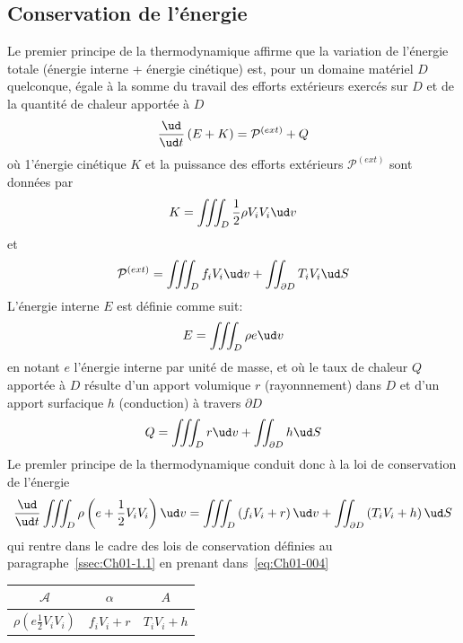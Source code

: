 \subsection{Conservation de l'énergie} \label{ssec:Ch01-3.1}
Le premier principe de la thermodynamique affirme que la variation de l'énergie totale (énergie interne + énergie cinétique) est, pour un domaine matériel $D$ quelconque, égale à la somme du travail des efforts extérieurs exercés sur $D$ et de la quantité de chaleur apportée à $D$
\begin{equation}
    \frac{\ud}{\ud t} \left( E + K \right) = \mathcal{P}^{(ext)} + Q
    \label{eq:Ch01-040}
\end{equation}
où 1'énergie cinétique $K$ et la puissance des efforts extérieurs $\mathcal{P}^{(ext)}$ sont données par
\begin{equation}
    K = \iiint_{D} \frac{1}{2} \rho V_i V_i \ud v
    \label{eq:Ch01-041}
\end{equation}
et
\begin{equation}
    \mathcal{P}^{(ext)} = \iiint_{D} f_i V_i \ud v + \iint_{\partial D} T_i V_i \ud S
    \label{eq:Ch01-042}
\end{equation}
L'énergie interne $E$ est définie comme suit:
\begin{equation}
    E = \iiint_{D} \rho e \ud v
    \label{eq:Ch01-043}
\end{equation}
en notant $e$ l'énergie interne par unité de masse, et où le taux de chaleur $Q$ apportée à $D$ résulte d'un apport volumique $r$ (rayonnnement) dans $D$ et d'un apport surfacique $h$ (conduction) à travers $\partial D$
\begin{equation}
    Q = \iiint_{D} r \ud v + \iint_{\partial D} h \ud S
    \label{eq:Ch01-044}
\end{equation}
Le premler principe de la thermodynamique conduit donc à la loi de conservation de l'énergie
\begin{equation}
    \frac{\ud}{\ud t} \iiint_D \rho \left( e + \frac{1}{2} V_i V_i \right) \ud v = \iiint_D \left( f_i V_i + r \right) \ud v + \iint_{\partial D} \left( T_i V_i + h \right) \ud S
    \label{eq:Ch01-045}
\end{equation}
qui rentre dans le cadre des lois de conservation définies au paragraphe~\ref{ssec:Ch01-1.1} en prenant
dans~\eqref{eq:Ch01-004}
\begin{table}
    \centering
    \begin{tabular}[]{c|c|c}
        $\mathcal{A}$ & $\alpha$ & $A$ \\ \hline
        $\rho \left( e \frac{1}{2} V_i V_i \right)$ & $f_i V_i + r$ & $T_i V_i + h$
    \end{tabular}
\end{table}

